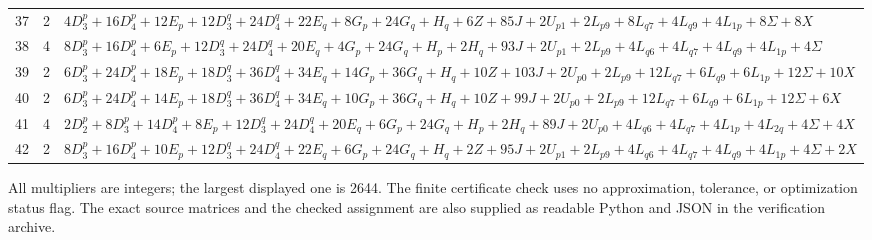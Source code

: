 \documentclass[11pt,a4paper]{article}
\theoremstyle{remark}
\begin{document}
\begin{longtable}{rrp{13.8cm}}
37&2&\( 4D_{3}^{p}+\allowbreak 16D_{4}^{p}+\allowbreak 12E_p+\allowbreak 12D_{3}^{q}+\allowbreak 24D_{4}^{q}+\allowbreak 22E_q+\allowbreak 8G_p+\allowbreak 24G_q+\allowbreak H_q+\allowbreak 6Z+\allowbreak 85J+\allowbreak 2U_{p1}+\allowbreak 2L_{p9}+\allowbreak 8L_{q7}+\allowbreak 4L_{q9}+\allowbreak 4L_{1p}+\allowbreak 8\Sigma+\allowbreak 8X \)\\
38&4&\( 8D_{3}^{p}+\allowbreak 16D_{4}^{p}+\allowbreak 6E_p+\allowbreak 12D_{3}^{q}+\allowbreak 24D_{4}^{q}+\allowbreak 20E_q+\allowbreak 4G_p+\allowbreak 24G_q+\allowbreak H_p+\allowbreak 2H_q+\allowbreak 93J+\allowbreak 2U_{p1}+\allowbreak 2L_{p9}+\allowbreak 4L_{q6}+\allowbreak 4L_{q7}+\allowbreak 4L_{q9}+\allowbreak 4L_{1p}+\allowbreak 4\Sigma \)\\
39&2&\( 6D_{3}^{p}+\allowbreak 24D_{4}^{p}+\allowbreak 18E_p+\allowbreak 18D_{3}^{q}+\allowbreak 36D_{4}^{q}+\allowbreak 34E_q+\allowbreak 14G_p+\allowbreak 36G_q+\allowbreak H_q+\allowbreak 10Z+\allowbreak 103J+\allowbreak 2U_{p0}+\allowbreak 2L_{p9}+\allowbreak 12L_{q7}+\allowbreak 6L_{q9}+\allowbreak 6L_{1p}+\allowbreak 12\Sigma+\allowbreak 10X \)\\
40&2&\( 6D_{3}^{p}+\allowbreak 24D_{4}^{p}+\allowbreak 14E_p+\allowbreak 18D_{3}^{q}+\allowbreak 36D_{4}^{q}+\allowbreak 34E_q+\allowbreak 10G_p+\allowbreak 36G_q+\allowbreak H_q+\allowbreak 10Z+\allowbreak 99J+\allowbreak 2U_{p0}+\allowbreak 2L_{p9}+\allowbreak 12L_{q7}+\allowbreak 6L_{q9}+\allowbreak 6L_{1p}+\allowbreak 12\Sigma+\allowbreak 6X \)\\
41&4&\( 2D_{2}^{p}+\allowbreak 8D_{3}^{p}+\allowbreak 14D_{4}^{p}+\allowbreak 8E_p+\allowbreak 12D_{3}^{q}+\allowbreak 24D_{4}^{q}+\allowbreak 20E_q+\allowbreak 6G_p+\allowbreak 24G_q+\allowbreak H_p+\allowbreak 2H_q+\allowbreak 89J+\allowbreak 2U_{p0}+\allowbreak 4L_{q6}+\allowbreak 4L_{q7}+\allowbreak 4L_{1p}+\allowbreak 4L_{2q}+\allowbreak 4\Sigma+\allowbreak 4X \)\\
42&2&\( 8D_{3}^{p}+\allowbreak 16D_{4}^{p}+\allowbreak 10E_p+\allowbreak 12D_{3}^{q}+\allowbreak 24D_{4}^{q}+\allowbreak 22E_q+\allowbreak 6G_p+\allowbreak 24G_q+\allowbreak H_q+\allowbreak 2Z+\allowbreak 95J+\allowbreak 2U_{p1}+\allowbreak 2L_{p9}+\allowbreak 4L_{q6}+\allowbreak 4L_{q7}+\allowbreak 4L_{q9}+\allowbreak 4L_{1p}+\allowbreak 4\Sigma+\allowbreak 2X \)\\
\bottomrule
\end{longtable}
\endgroup
All multipliers are integers; the largest displayed one is 2644. The
finite certificate check uses no approximation, tolerance, or optimization
status flag. The exact source matrices and the checked assignment are
also supplied as readable Python and JSON in the verification archive.
\end{document}
